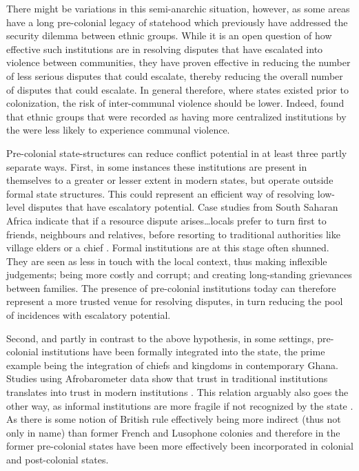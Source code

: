 \documentclass[12pt]{article}
\begin{document}
There might be variations in this semi-anarchic situation, however, as some
areas have a long pre-colonial legacy of statehood which previously have
addressed the security dilemma between ethnic groups. While it is an open
question of how effective such institutions are in resolving disputes that have
escalated into violence between communities, they have proven effective in
reducing the number of less serious disputes that could escalate, thereby
reducing the overall number of disputes that could escalate. In general
therefore, where states existed prior to colonization, the risk of
inter-communal violence should be lower. Indeed, \citet{Wig2018} found that
ethnic groups that were recorded as having more centralized institutions by the
\citet{Murdock1967} were less likely to experience communal violence.

Pre-colonial state-structures can reduce conflict potential in at least three
partly separate ways. First, in some instances these institutions are present in
themselves to a greater or lesser extent in modern states, but operate outside
formal state structures. This could represent an efficient way of resolving
low-level disputes that have escalatory potential.  Case studies from South
Saharan Africa indicate that if a resource dispute arises…locals prefer to turn
first to friends, neighbours and relatives, before resorting to traditional
authorities like village elders or a chief \citep{Turner_2012}.  Formal
institutions are at this stage often shunned. They are seen as less in touch
with the local context, thus making inflexible judgements; being more costly and
corrupt; and creating long-standing grievances between families.  The presence
of pre-colonial institutions today can therefore represent a more trusted venue
for resolving disputes, in turn reducing the pool of incidences with escalatory
potential.  

Second, and partly in contrast to the above hypothesis, in some settings,
pre-colonial institutions have been formally integrated into the state, the
prime example being the integration of chiefs and kingdoms in contemporary
Ghana. Studies using Afrobarometer data show that trust in traditional
institutions translates into trust in modern institutions \citep{Logan_2009}.
This relation arguably also goes the other way, as informal institutions are
more fragile if not recognized by the state \citep{ostrom1990governing}. As
there is some notion of British rule effectively being more indirect (thus not
only in name) than former French and Lusophone colonies and therefore in the
former pre-colonial states have been more effectively been incorporated in
colonial and post-colonial states. 
\end{document}
